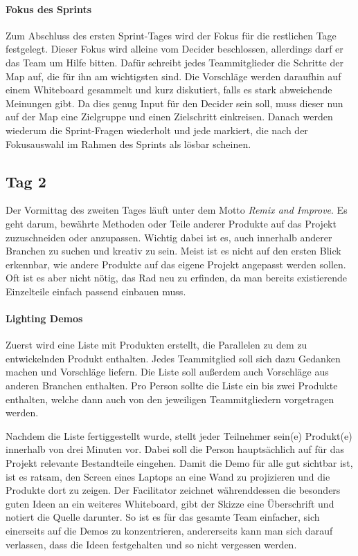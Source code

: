 \paragraph{Fokus des Sprints}
Zum Abschluss des ersten Sprint-Tages wird der Fokus für die restlichen Tage festgelegt. Dieser Fokus wird alleine vom Decider beschlossen, allerdings darf er das Team um Hilfe bitten. Dafür schreibt jedes Teammitglieder die Schritte der Map auf, die für ihn am wichtigsten sind. Die Vorschläge werden daraufhin auf einem Whiteboard gesammelt und kurz diskutiert, falls es stark abweichende Meinungen gibt. Da dies genug Input für den Decider sein soll, muss dieser nun auf der Map eine Zielgruppe und einen Zielschritt einkreisen. Danach werden wiederum die Sprint-Fragen wiederholt und jede markiert, die nach der Fokusauswahl im Rahmen des Sprints als lösbar scheinen.

\subsection*{Tag 2}
Der Vormittag des zweiten Tages läuft unter dem Motto \textit{Remix and Improve}. Es geht darum, bewährte Methoden oder Teile anderer Produkte auf das Projekt zuzuschneiden oder anzupassen. Wichtig dabei ist es, auch innerhalb anderer Branchen zu suchen und kreativ zu sein. Meist ist es nicht auf den ersten Blick erkennbar, wie andere Produkte auf das eigene Projekt angepasst werden sollen. Oft ist es aber nicht nötig, das Rad neu zu erfinden, da man bereits existierende Einzelteile einfach passend einbauen muss.

\paragraph{Lighting Demos}
Zuerst wird eine Liste mit Produkten erstellt, die Parallelen zu dem zu entwickelnden Produkt enthalten. Jedes Teammitglied soll sich dazu Gedanken machen und Vorschläge liefern. Die Liste soll außerdem auch Vorschläge aus anderen Branchen enthalten. Pro Person sollte die Liste ein bis zwei Produkte enthalten, welche dann auch von den jeweiligen Teammitgliedern vorgetragen werden.

Nachdem die Liste fertiggestellt wurde, stellt jeder Teilnehmer sein(e) Produkt(e) innerhalb von drei Minuten vor. Dabei soll die Person hauptsächlich auf für das Projekt relevante Bestandteile eingehen. Damit die Demo für alle gut sichtbar ist, ist es ratsam, den Screen eines Laptops an eine Wand zu projizieren und die Produkte dort zu zeigen. Der Facilitator zeichnet währenddessen die besonders guten Ideen an ein weiteres Whiteboard, gibt der Skizze eine Überschrift und notiert die Quelle darunter. So ist es für das gesamte Team einfacher, sich einerseits auf die Demos zu konzentrieren, andererseits kann man sich darauf verlassen, dass die Ideen festgehalten und so nicht vergessen werden.

